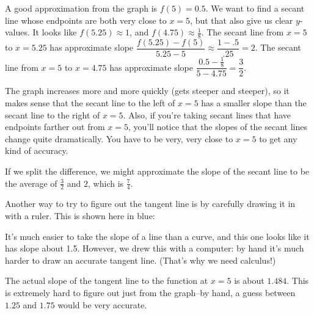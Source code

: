 \begin{solution} A good approximation from the graph is $f(5)=0.5$. We want to find a secant line whose endpoints are both very close to $x=5$, but that also give us clear $y$-values. It looks like $f(5.25) \approx 1$, and $f(4.75)\approx \frac{1}{8}$. The secant line from $x=5$ to $x=5.25$ has approximate slope $\dfrac{f(5.25)-f(5)}{5.25-5}\approx \dfrac{1-.5}{.25}=2$. The secant line from $x=5$ to $x=4.75$ has approximate slope $\dfrac{0.5-\frac{1}{8}}{5-4.75}=\dfrac{3}{2}$.

The graph increases more and more quickly (gets steeper and steeper), so it makes sense that the secant line to the left of $x=5$ has a smaller slope than the secant line to the right of $x=5$.  Also, if you're taking secant lines that have endpoints farther out from $x=5$, you'll notice that the slopes of the secant lines change quite dramatically. You have to be very, very close to $x=5$ to get any kind of accuracy.

If we split the difference, we might approximate the slope of the secant line to be the average of $\frac{3}{2}$ and $2$, which is $\frac{7}{4}$.

Another way to try to figure out the tangent line is by carefully drawing it in with a ruler. This is shown here in blue:
\begin{center}
\end{center}
It's much easier to take the slope of a line than a curve, and this one looks like it has slope about 1.5. However, we drew this with a computer: by hand it's much harder to draw an accurate tangent line. (That's why we need calculus!)

The actual slope of the tangent line to the function at $x=5$ is about $1.484$. This is extremely hard to figure out just from the graph--by hand, a guess between $1.25$ and $1.75$ would be very accurate.
\end{solution}



